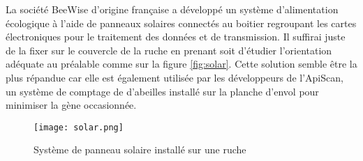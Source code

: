La société BeeWise d'origine française a développé un système d'alimentation écologique à l'aide de panneaux solaires connectés au  boitier regroupant les cartes électroniques pour le traitement des données et de transmission. Il suffirai juste de la fixer sur le couvercle de la ruche en prenant soit d'étudier l'orientation adéquate au préalable comme sur la figure \ref{fig:solar}. Cette solution semble être la plus répandue car elle est également utilisée par les développeurs de l'ApiScan, un système de comptage de d'abeilles installé sur la planche d'envol pour minimiser la gène occasionnée.    

\begin{figure}[h]
\centering\texttt{[image: solar.png]}
\caption{\label{fig:app} Système de panneau solaire installé sur une ruche}
\end{figure} 

   